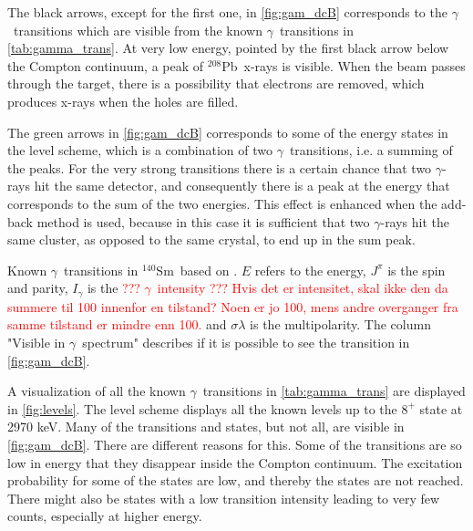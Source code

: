 \documentclass[twoside,english]{uiofysmaster/uiofysmaster}
\newcommand{\Sm}{$^{140}$Sm} %
\newcommand{\Pb}{$^{208}$Pb}
\newcommand{\ga}{$\gamma$}
\let\orgautoref\autoref
\renewcommand{\autoref}
        {%
		 \def\sectionautorefname{Section}%
		 \def\subsectionautorefname{Section}%
		 \def\subsubsectionautorefname{Section}%
		 \def\chapterautorefname{Chapter}%
          \orgautoref}
\begin{document}
The black arrows, except for the first one, in \autoref{fig:gam_dcB} corresponds to the \ga\ transitions which are visible from the known \ga\ transitions in \autoref{tab:gamma_trans}. 
At very low energy, pointed by the first black arrow below the Compton continuum, a peak of \Pb\ x-rays is visible. 
When the beam passes through the target, there is a possibility that electrons are removed, which produces x-rays when the holes are filled.

The green arrows in \autoref{fig:gam_dcB} corresponds to some of the energy states in the level scheme, which is a combination of two \ga\ transitions, i.e. a summing of the peaks.
For the very strong transitions there is a certain chance that two \ga-rays hit the same detector, and consequently there is a peak at the energy that corresponds to the sum of the two energies. 
This effect is enhanced when the add-back method is used, because in this case it is sufficient that two \ga-rays hit the same cluster, as opposed to the same crystal, to end up in the sum peak.

\begin{table}[htb!] 
    \centering 
    \caption{Known \ga\ transitions in \Sm\ based on \cite{Klintefjord, NNDC-levels}. 
    $E$ refers to the energy, $J^\pi$ is the spin and parity, $I_\gamma$ is the \textcolor{red}{??? \ga\ intensity ??? Hvis det er intensitet, skal ikke den da summere til 100 innenfor en tilstand? Noen er jo 100, mens andre overganger fra samme tilstand er mindre enn 100.} and $\sigma \lambda$ is the multipolarity. 
    The column "Visible in \ga\ spectrum" describes if it is possible to see the transition in \autoref{fig:gam_dcB}.}
	
	\label{tab:gamma_trans}
\end{table}

A visualization of all the known \ga\ transitions in \autoref{tab:gamma_trans} are displayed in \autoref{fig:levels}. 
The level scheme displays all the known levels up to the $8^+$ state at 2970 keV. 
Many of the transitions and states, but not all, are visible in \autoref{fig:gam_dcB}.
There are different reasons for this.
Some of the transitions are so low in energy that they disappear inside the Compton continuum.
The excitation probability for some of the states are low, and thereby the states are not reached.
There might also be states with a low transition intensity leading to very few counts, especially at higher energy.
\end{document}
